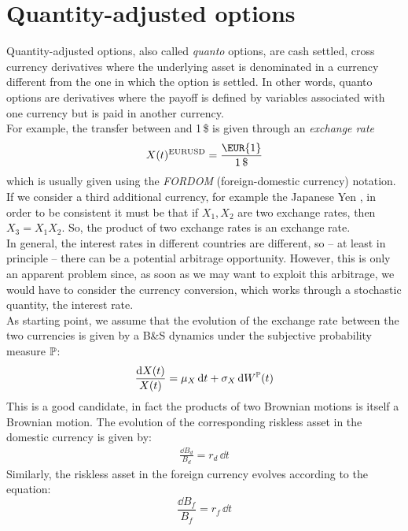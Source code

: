 \section{Quantity-adjusted options} %
Quantity-adjusted options, also called \emph{quanto} options, are cash settled, cross currency derivatives where the underlying asset is denominated in a currency different from the one in which the option is settled. In other words, quanto options are derivatives where the payoff is defined by variables associated with one currency but is paid in another currency. \\
For example, the transfer between  and 1\,\$ is given through an \emph{exchange rate}
\begin{equation}
    X(t)^{\text{EURUSD}} = \dfrac{\text{\EUR{1}}}{1\,\$}
\end{equation}
which is usually given using the \emph{FORDOM} (foreign-domestic currency) notation. If we consider a third additional currency, for example the Japanese Yen \textyen, in order to be consistent it must be that if $X_1, X_2$ are two exchange rates, then $X_3 = X_1X_2$. So, the product of two exchange rates is an exchange rate.\\
In general, the interest rates in different countries are different, so  -- at least in principle -- there can be a potential arbitrage opportunity. However, this is only an apparent problem since, as soon as we may want to exploit this arbitrage, we would have to consider the currency conversion, which works through a stochastic quantity, the interest rate. \\
As starting point, we assume that the evolution of the exchange rate between the two currencies is given by a B\&S dynamics under the subjective probability measure $\mathbb{P}$:
\begin{align}
    \frac{\dd X(t)}{X(t)} = \mu_X\,\dd t + \sigma_X\,\dd W^{\mathbb{P}}(t)
\end{align}
This is a good candidate, in fact the products of two Brownian motions is itself a Brownian motion. The evolution of the corresponding riskless asset in the domestic currency is given by:
\begin{align}\label{dd}
    \frac{\dd B_d}{B_d} = r_d\,\dd t
\end{align}
Similarly, the riskless asset in the foreign currency evolves according to the equation:
\begin{equation}\label{fffffffffffff}
    \frac{\dd B_f}{B_f} = r_f\,\dd t
\end{equation}
